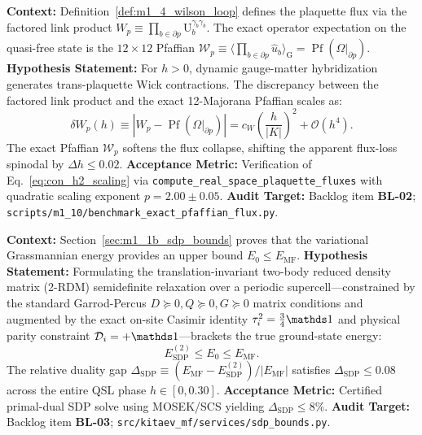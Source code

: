 \begin{contract}
\label{con:h2_plaquette_pfaffian}
\textbf{Context:} Definition~\ref{def:m1_4_wilson_loop} defines the plaquette flux via the factored link product $W_p \equiv \prod_{b \in \partial p} \mathrm{U}_b^{\gamma_b \gamma_b}$. The exact operator expectation on the quasi-free state is the $12 \times 12$ Pfaffian $\mathcal{W}_p \equiv \langle \prod_{b \in \partial p} \hat{u}_b \rangle_{\mathrm{G}} = \operatorname{Pf}(\Omega|_{\partial p})$.
\textbf{Hypothesis Statement:} For $h > 0$, dynamic gauge-matter hybridization generates trans-plaquette Wick contractions. The discrepancy between the factored link product and the exact 12-Majorana Pfaffian scales as:
\begin{equation}
\label{eq:con_h2_scaling}
\delta W_p(h) \equiv \left| W_p - \operatorname{Pf}(\Omega|_{\partial p}) \right| = c_W \left(\frac{h}{|K|}\right)^2 + \mathcal{O}(h^4).
\end{equation}
The exact Pfaffian $\mathcal{W}_p$ softens the flux collapse, shifting the apparent flux-loss spinodal by $\Delta h \le 0.02$.
\textbf{Acceptance Metric:} Verification of Eq.~\eqref{eq:con_h2_scaling} via \texttt{compute\_real\_space\_plaquette\_fluxes} with quadratic scaling exponent $p = 2.00 \pm 0.05$.
\textbf{Audit Target:} Backlog item \textbf{BL-02}; \texttt{scripts/m1\_10/benchmark\_exact\_pfaffian\_flux.py}.
\end{contract}

\begin{contract}
\label{con:h3_2rdm_sdp}
\textbf{Context:} Section~\ref{sec:m1_1b_sdp_bounds} proves that the variational Grassmannian energy provides an upper bound $E_0 \le E_{\mathrm{MF}}$.
\textbf{Hypothesis Statement:} Formulating the translation-invariant two-body reduced density matrix (2-RDM) semidefinite relaxation over a periodic supercell—constrained by the standard Garrod-Percus $D \succeq 0, Q \succeq 0, G \succeq 0$ matrix conditions and augmented by the exact on-site Casimir identity $\tau_i^2 = \frac{3}{4}\Id$ and physical parity constraint $\mathcal{D}_i = +\Id$—brackets the true ground-state energy:
\begin{equation}
E_{\mathrm{SDP}}^{(2)} \le E_0 \le E_{\mathrm{MF}}.
\end{equation}
The relative duality gap $\Delta_{\mathrm{SDP}} \equiv (E_{\mathrm{MF}} - E_{\mathrm{SDP}}^{(2)}) / |E_{\mathrm{MF}}|$ satisfies $\Delta_{\mathrm{SDP}} \le 0.08$ across the entire QSL phase $h \in [0, 0.30]$.
\textbf{Acceptance Metric:} Certified primal-dual SDP solve using MOSEK/SCS yielding $\Delta_{\mathrm{SDP}} \le 8\%$.
\textbf{Audit Target:} Backlog item \textbf{BL-03}; \texttt{src/kitaev\_mf/services/sdp\_bounds.py}.
\end{contract}

